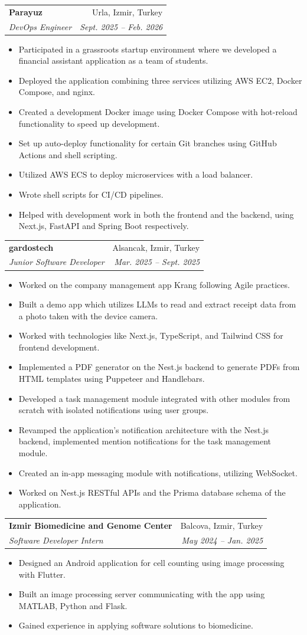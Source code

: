 \documentclass[letterpaper,10pt]{article}
\makeatletter
\newcommand{\resumeItem}[1]{
  \item\small{
    {#1 \vspace{-2pt}}
  }
}
\newcommand{\resumeSubheading}[4]{
  \vspace{-1pt}\item
    \begin{tabular*}{0.97\textwidth}[t]{l@{\extracolsep{\fill}}r}
      \textbf{#1} & #2 \\
      \textit{\small#3} & \textit{\small #4} \\
    \end{tabular*}\vspace{-7pt}
}
\newcommand{\resumeItemListStart}{\begin{itemize}}
\newcommand{\resumeItemListEnd}{\end{itemize}\vspace{-5pt}}
\makeatother
\begin{document}
    \resumeSubheading
      {Parayuz}{Urla, Izmir, Turkey}
      {DevOps Engineer}{Sept. 2025 -- Feb. 2026}
      \resumeItemListStart
        \resumeItem{Participated in a grassroots startup environment where we developed a financial assistant application as a team of students.}
        \resumeItem{Deployed the application combining three services utilizing AWS EC2, Docker Compose, and nginx.}
        \resumeItem{Created a development Docker image using Docker Compose with hot-reload functionality to speed up development.}
        \resumeItem{Set up auto-deploy functionality for certain Git branches using GitHub Actions and shell scripting.}
        \resumeItem{Utilized AWS ECS to deploy microservices with a load balancer.}
        \resumeItem{Wrote shell scripts for CI/CD pipelines.}
        \resumeItem{Helped with development work in both the frontend and the backend, using Next.js, FastAPI and Spring Boot respectively.}
      \resumeItemListEnd

    \resumeSubheading
      {gardostech}{Alsancak, Izmir, Turkey}
      {Junior Software Developer}{Mar. 2025 -- Sept. 2025}
      \resumeItemListStart
        \resumeItem{Worked on the company management app Krang following Agile practices.}
        \resumeItem{Built a demo app which utilizes LLMs to read and extract receipt data from a photo taken with the device camera.}
        \resumeItem{Worked with technologies like Next.js, TypeScript, and Tailwind CSS for frontend development.}
        \resumeItem{Implemented a PDF generator on the Nest.js backend to generate PDFs from HTML templates using Puppeteer and Handlebars.}
        \resumeItem{Developed a task management module integrated with other modules from scratch with isolated notifications using user groups.}
        \resumeItem{Revamped the application's notification architecture with the Nest.js backend, implemented mention notifications for the task management module.}
        \resumeItem{Created an in-app messaging module with notifications, utilizing WebSocket.}
        \resumeItem{Worked on Nest.js RESTful APIs and the Prisma database schema of the application.}
      \resumeItemListEnd

    \resumeSubheading
      {Izmir Biomedicine and Genome Center}{Balcova, Izmir, Turkey}
      {Software Developer Intern}{May 2024 -- Jan. 2025}
      \resumeItemListStart
        \resumeItem{Designed an Android application for cell counting using image processing with Flutter.}
        \resumeItem{Built an image processing server communicating with the app using MATLAB, Python and Flask.}
        \resumeItem{Gained experience in applying software solutions to biomedicine.}
      \resumeItemListEnd
\end{document}
